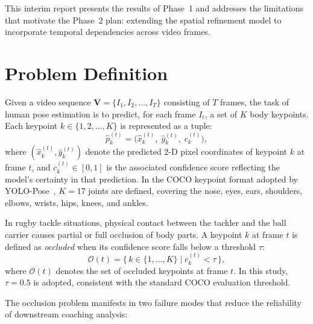 \documentclass{article}
\begin{document}
This interim report presents the results of Phase~1 and addresses 
the limitations that motivate the Phase~2 plan: extending the spatial 
refinement model to incorporate temporal dependencies across video frames.

\section{Problem Definition}

Given a video sequence $\mathbf{V} = \{I_1, I_2, \ldots, I_T\}$ consisting
of $T$ frames, the task of human pose estimation is to predict, for each
frame $I_t$, a set of $K$ body keypoints.
Each keypoint $k \in \{1, 2, \ldots, K\}$ is represented as a tuple:
\begin{equation}
  \hat{p}_k^{(t)} = \bigl(\hat{x}_k^{(t)},\; \hat{y}_k^{(t)},\; c_k^{(t)}\bigr),
  \label{eq:keypoint}
\end{equation}
where $(\hat{x}_k^{(t)}, \hat{y}_k^{(t)})$ denote the predicted 2-D pixel
coordinates of keypoint $k$ at frame $t$, and $c_k^{(t)} \in [0,1]$ is the
associated confidence score reflecting the model's certainty in that
prediction.
In the COCO keypoint format adopted by YOLO-Pose~\cite{maji2022yolopose},
$K = 17$ joints are defined, covering the nose, eyes, ears, shoulders,
elbows, wrists, hips, knees, and ankles.

In rugby tackle situations, physical contact between the tackler and the
ball carrier causes partial or full occlusion of body parts.
A keypoint $k$ at frame $t$ is defined as \emph{occluded} when its
confidence score falls below a threshold $\tau$:
\begin{equation}
  \mathcal{O}(t)
    = \bigl\{\, k \in \{1,\ldots,K\} \;\big|\; c_k^{(t)} < \tau \,\bigr\},
  \label{eq:occlusion_set}
\end{equation}
where $\mathcal{O}(t)$ denotes the set of occluded keypoints at frame $t$.
In this study, $\tau = 0.5$ is adopted, consistent with the standard COCO
evaluation threshold.

The occlusion problem manifests in two failure modes that reduce the
reliability of downstream coaching analysis:
\end{document}
